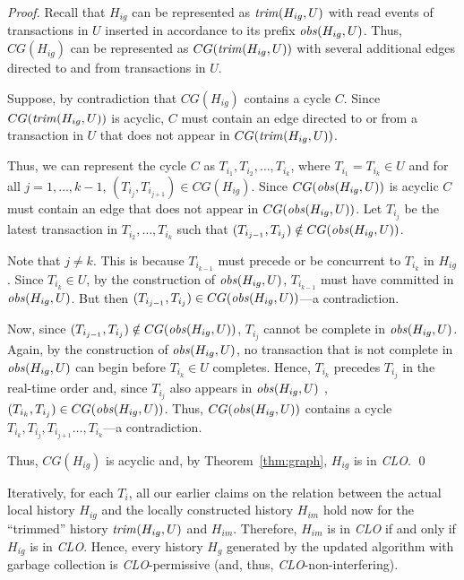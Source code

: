 \documentclass{llncs}
\newcommand{\id}[1]{\mbox{\textit{#1}}}\newcommand{\res}[1]{\mbox{\textbf{#1}}}
\newcommand{\clo} {\textit{CLO}}
\begin{document}
{\begin{proof}
Recall that $H_{ig}$ can be represented as $\id{trim}(H_{ig},U)$ with
read events of transactions in $U$ inserted in accordance to its prefix  $\id{obs}(H_{ig},U)$.
Thus, $CG(H_{ig})$ can be represented as $CG(\id{trim}(H_{ig},U))$ 
with several additional edges directed to and from transactions in
$U$.

Suppose, by contradiction that $CG(H_{ig})$ contains a cycle $C$. 
Since $CG(\id{trim}(H_{ig},U))$ is acyclic, $C$ must contain an edge
directed to or from a transaction in $U$ that does not appear in $CG(\id{trim}(H_{ig},U))$.   

Thus, we can represent the cycle $C$ as
$T_{i_1},T_{i_2},\ldots,T_{i_k}$, where $T_{i_1}=T_{i_k}\in U$ and for all
$j=1,\ldots,k-1$, $(T_{i_j},T_{i_{j+1}})\in CG(H_{ig})$. 
Since  $CG(\id{obs}(H_{ig},U))$ is acyclic $C$ must contain an edge
that does not appear in $CG(\id{obs}(H_{ig},U))$. 
Let $T_{i_j}$ be the latest transaction in
$T_{i_2},\ldots,T_{i_k}$ such that $(T_{i_{j-1}},T_{i_j})\notin
CG(\id{obs}(H_{ig},U))$.

Note that $j\neq k$. This is because $T_{i_{k-1}}$
must precede or be concurrent to $T_{i_{k}}$ in $H_{ig}$. 
Since $T_{i_{k}}\in U$, by the construction of $\id{obs}(H_{ig},U)$,
$T_{i_{k-1}}$ must have committed in $\id{obs}(H_{ig},U)$.
But then $(T_{i_{j-1}},T_{i_j})\in CG(\id{obs}(H_{ig},U))$---a contradiction.

Now, since $(T_{i_{j-1}},T_{i_j})\notin
CG(\id{obs}(H_{ig},U))$, $T_{i_j}$ cannot be complete in
$\id{obs}(H_{ig},U)$.   
Again, by the construction of $\id{obs}(H_{ig},U)$, no transaction
that is not complete in $\id{obs}(H_{ig},U)$ can begin before
$T_{i_k}\in U$ completes. 
Hence, $T_{i_k}$ precedes $T_{i_j}$ in the real-time order and, since
$T_{i_j}$ also appears in $\id{obs}(H_{ig},U)$ , $(T_{i_{k}},T_{i_j})\in
CG(\id{obs}(H_{ig},U))$. 
Thus, $CG(\id{obs}(H_{ig},U))$ contains a cycle $T_{i_{k}},T_{i_j},
T_{i_{j+1}}\ldots,T_{i_k}$---a contradiction. 

Thus, $CG(H_{ig})$ is acyclic and, by Theorem~\ref{thm:graph}, $H_{ig}$
is in {\clo}. \qed
\end{proof}
}

Iteratively, for each $T_i$, all our earlier claims on the relation
between the actual local history $H_{ig}$  and the locally constructed
history $H_{im}$ hold now for the ``trimmed'' history $\id{trim}(H_{ig},U)$ and $H_{im}$.
Therefore, $H_{im}$ is in {\clo} if and only if
$H_{ig}$ is in {\clo}. Hence, every history $H_g$ generated
by the updated algorithm with garbage collection is \clo-permissive (and,
thus, \clo-non-interfering).
\end{document}

